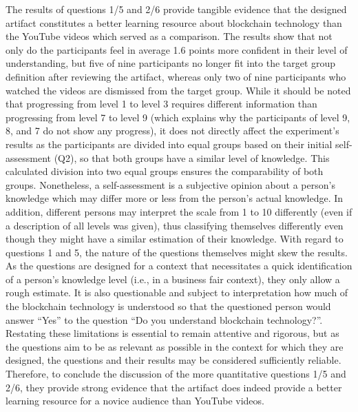 The results of questions 1/5 and 2/6 provide tangible evidence that the designed artifact constitutes a better learning resource about blockchain technology than the YouTube videos which served as a comparison. The results show that not only do the participants feel in average 1.6 points more confident in their level of understanding, but five of nine participants no longer fit into the target group definition after reviewing the artifact, whereas only two of nine participants who watched the videos are dismissed from the target group. While it should be noted that progressing from level 1 to level 3 requires different information than progressing from level 7 to level 9 (which explains why the participants of level 9, 8, and 7 do not show any progress), it does not directly affect the experiment's results as the participants are divided into equal groups based on their initial self-assessment (Q2), so that both groups have a similar level of knowledge. This calculated division into two equal groups ensures the comparability of both groups. Nonetheless, a self-assessment is a subjective opinion about a person's knowledge which may differ more or less from the person's actual knowledge. In addition, different persons may interpret the scale from 1 to 10 differently (even if a description of all levels was given), thus classifying themselves differently even though they might have a similar estimation of their knowledge. With regard to questions 1 and 5, the nature of the questions themselves might skew the results. As the questions are designed for a context that necessitates a quick identification of a person's knowledge level (i.e., in a business fair context), they only allow a rough estimate. It is also questionable and subject to interpretation how much of the blockchain technology is understood so that the questioned person would answer \enquote{Yes} to the question \enquote{Do you understand blockchain technology?}. Restating these limitations is essential to remain attentive and rigorous, but as the questions aim to be as relevant as possible in the context for which they are designed, the questions and their results may be considered sufficiently reliable. Therefore, to conclude the discussion of the more quantitative questions 1/5 and 2/6, they provide strong evidence that the artifact does indeed provide a better learning resource for a novice audience than YouTube videos.

